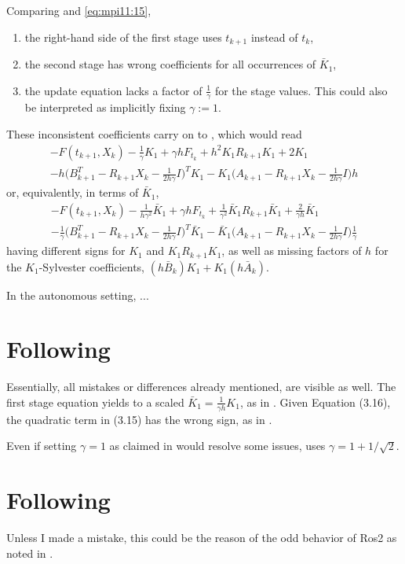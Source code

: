Comparing \cite[Equation (15)]{MPIMD11-06} and \eqref{eq:mpi11:15},
\begin{enumerate}
  \item
    the right-hand side of the first stage uses $t_{k+1}$ instead of $t_k$,
  \item
    the second stage has wrong coefficients for all occurrences of $\bar{K}_1$,
  \item
    the update equation lacks a factor of $\frac{1}{\gamma}$ for the stage values.
    This could also be interpreted as implicitly fixing $\gamma := 1$.
    \label{item:implicit gamma=1}
\end{enumerate}
These inconsistent coefficients carry on to \cite[Equation (16)]{MPIMD11-06},
which would read
\begin{multline}
  -F(t_{k+1}, X_k) - \tfrac{1}{\gamma} K_1 + \gamma h F_{t_k} + h^2 K_1 R_{k+1} K_1 + 2K_1 \\
  -h \big( B^T_{k+1} - R_{k+1}X_k - \tfrac{1}{2h\gamma}I \big)^T K_1
  -K_1 \big( A_{k+1} - R_{k+1}X_k - \tfrac{1}{2h\gamma}I \big) h
\end{multline}
or, equivalently, in terms of $\bar{K}_1$,
\begin{multline}
  -F(t_{k+1}, X_k) - \tfrac{1}{h\gamma^2} \bar{K}_1 + \gamma h F_{t_k} + \tfrac{1}{\gamma^2} \bar{K}_1 R_{k+1} \bar{K}_1 + \tfrac{2}{\gamma h}\bar{K}_1 \\
  -\tfrac{1}{\gamma} \big( B^T_{k+1} - R_{k+1}X_k - \tfrac{1}{2h\gamma}I \big)^T \bar{K}_1
  -\bar{K}_1 \big( A_{k+1} - R_{k+1}X_k - \tfrac{1}{2h\gamma}I \big) \tfrac{1}{\gamma}
\end{multline}
having different signs for $K_1$ and $K_1R_{k+1}K_1$,
as well as missing factors of $h$ for the $K_1$-Sylvester coefficients, $(h\bar{B}_k) K_1 + K_1 (h\bar{A}_k)$.

In the autonomous setting, ...

\section{Following \cite{MPIMD12-13}}

Essentially, all mistakes or differences already mentioned, are visible as well.
The first stage equation \cite[Equation (3.14)]{MPIMD12-13} yields to a scaled $\bar{K}_1 = \frac{1}{\gamma h}K_1$, as in \cite{MPIMD11-06}.
Given Equation (3.16), the quadratic term in (3.15) has the wrong sign, as in \cite{Mena2007}.

Even if setting $\gamma=1$ as claimed in \cite[17]{MPIMD12-13} would resolve some issues,
\cite{Lang2015} uses $\gamma = 1 + 1/\sqrt{2}$.

\section{Following \cite{Lang2015}}

Unless I made a mistake, this could be the reason of the odd behavior of Ros2 as noted in \cite[63]{Lang2015}.
